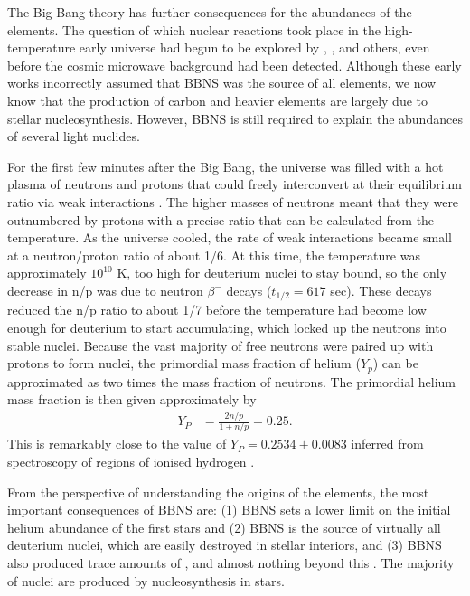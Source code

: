 The Big Bang theory has further consequences for the abundances of the elements. The question of which nuclear reactions took place in the high-temperature early universe had begun to be explored by \citet{Gamow:1946hk}, \citet{Alpher:1948jc}, and others, even before the cosmic microwave background had been detected. Although these early works incorrectly assumed that \gls{BBNS} was the source of all elements, we now know that the production of carbon and heavier elements are largely due to stellar nucleosynthesis. However, \gls{BBNS} is still required to explain the abundances of several light nuclides.

For the first few minutes after the Big Bang, the universe was filled with a hot plasma of neutrons and protons that could freely interconvert at their equilibrium ratio via weak interactions \citep{Hayashi:1950wg,Alpher:1953ew}. The higher masses of neutrons meant that they were outnumbered by protons with a precise ratio that can be calculated from the temperature. As the universe cooled, the rate of weak interactions became small at a neutron/proton ratio of about 1/6. At this time, the temperature was approximately $10^{10}$ K, too high for deuterium nuclei to stay bound, so the only decrease in n/p was due to neutron $\beta^-$ decays ($t_{1/2}=617$ sec). These decays reduced the n/p ratio to about 1/7 before the temperature had become low enough for deuterium to start accumulating, which locked up the neutrons into stable nuclei. Because the vast majority of free neutrons were paired up with protons to form  nuclei, the primordial mass fraction of helium ($Y_p$) can be approximated as two times the mass fraction of neutrons. The primordial helium mass fraction is then given approximately by
\begin{align*}
	Y_P &= \frac{2n/p}{1 + n/p} = 0.25.
\end{align*}
This is remarkably close to the value of $Y_P=0.2534\pm0.0083$ inferred from spectroscopy of regions of ionised hydrogen \citep[\HII regions;][]{Aver:2012dv}.

From the perspective of understanding the origins of the elements, the most important consequences of \gls{BBNS} are: (1) \gls{BBNS} sets a lower limit on the initial helium abundance of the first stars and (2) \gls{BBNS} is the source of virtually all deuterium nuclei, which are easily destroyed in stellar interiors, and (3) \gls{BBNS} also produced trace amounts of , and almost nothing beyond this \citep{Wagoner:1967if,Tytler:2000km}. The majority of nuclei are produced by nucleosynthesis in stars.

